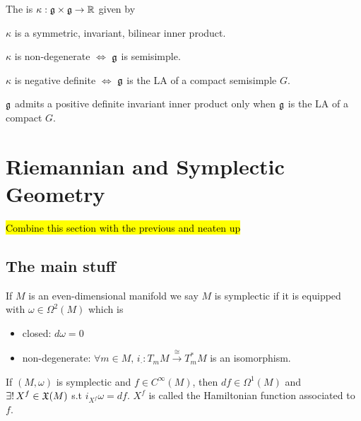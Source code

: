 \documentclass{article}
\begin{document}
\begin{definition}
	The  is $\kappa:\mathfrak{g} \times \mathfrak{g} \to \mathbb{R}$ given by 
\end{definition}

\begin{lemma}
	$\kappa$ is a symmetric, invariant, bilinear inner product. 
\end{lemma}

\begin{fact}
	$\kappa$ is non-degenerate $\Leftrightarrow$ $\mathfrak{g}$ is semisimple. 
\end{fact}

\begin{fact}
	$\kappa$ is negative definite $\Leftrightarrow$ $\mathfrak{g}$ is the LA of a compact semisimple $G$.
\end{fact}

\begin{fact}
	$\mathfrak{g}$ admits a positive definite invariant inner product only when $\mathfrak{g}$ is the LA of a compact $G$. 
\end{fact}
\section{Riemannian and Symplectic Geometry}
\hl{Combine this section with the previous and neaten up }
\subsection{The main stuff}

\begin{definition}
If $M$ is an even-dimensional manifold we say $M$ is symplectic if it is  equipped with $\omega \in \Omega^2(M)$ which is 
\begin{itemize}
    \item closed: $d\omega = 0$
    \item non-degenerate: $\forall m \in M,\, i_\cdot : T_m M \overset{\cong}{\to} T_m^\ast M$ is an isomorphism. 
\end{itemize}
\end{definition}

If $(M,\omega)$ is symplectic and $f \in C^\infty(M)$, then $df \in \Omega^1(M)$ and $\exists ! \, X^f \in \mathfrak{X}(M)$ s.t $i_{X^f}\omega = df$. $X^f$ is called the Hamiltonian function associated to $f$. 
\end{document}
